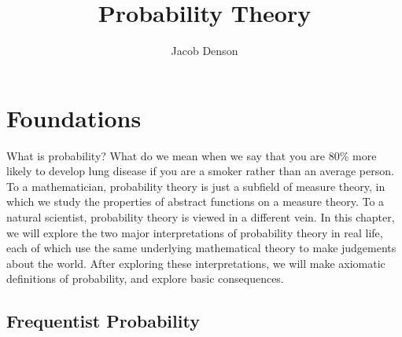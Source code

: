 

\DeclareMathOperator{\Prob}{\mathbf{P}}
\DeclareMathOperator{\Ber}{Ber}
\DeclareMathOperator{\Bin}{Bin}
\DeclareMathOperator{\Geo}{Geo}
\DeclareMathOperator{\Poisson}{Poisson}
\DeclareMathOperator{\Uni}{Uni}
\DeclareMathOperator{\Multi}{mult}
\DeclareMathOperator{\expect}{\mathbf{E}}

\title{Probability Theory}
\author{Jacob Denson}



\maketitle
\tableofcontents
{}

\chapter{Foundations}

What is probability? What do we mean when we say that you are 80\% more likely to develop lung disease if you are a smoker rather than an average person. To a mathematician, probability theory is just a subfield of measure theory, in which we study the properties of abstract functions on a measure theory. To a natural scientist, probability theory is viewed in a different vein. In this chapter, we will explore the two major interpretations of probability theory in real life, each of which use the same underlying mathematical theory to make judgements about the world. After exploring these interpretations, we will make axiomatic definitions of probability, and explore basic consequences.

\section{Frequentist Probability}

